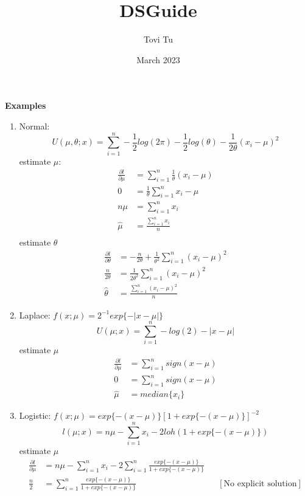 \documentclass[9pt]{article}
\title{DSGuide}
\author{Tovi Tu}
\date{March 2023}
\begin{document}
\textbf{Examples}
\begin{enumerate}
    \item Normal:
    $$
        U(\mu, \theta; x) = \sum^{n}_{i=1} -\frac{1}{2}log(2\pi) - \frac{1}{2}log(\theta) - \frac{1}{2\theta}(x_i-\mu)^2
    $$
    estimate $\mu$:
    \begin{align*}
        \frac{\partial l}{\partial \mu} &= \sum^{n}_{i=1} \frac{1}{\theta} (x_i-\mu)\\
        0 &= \frac{1}{\theta} \sum^{n}_{i=1} x_i - \mu\\
        n\mu &= \sum^{n}_{i=1} x_i\\
        \hat \mu &= \frac{\sum^{n}_{i=1} x_i}{n}\\
    \end{align*}
    estimate $\theta$ 
    \begin{align*}
        \frac{\partial l}{\partial \theta} &= -\frac{n}{2\theta} + \frac{1}{\theta^2} \sum^{n}_{i=1} (x_i-\mu)^2\\
        \frac{n}{2\theta} &= \frac{1}{2\theta^2} \sum^{n}_{i=1} (x_i-\mu)^2\\
        \hat \theta &= \frac{\sum^{n}_{i=1} (x_i-\mu)^2}{n}
    \end{align*}
    
    \item Laplace: $f(x;\mu)=2^{-1}exp\{-|x-\mu|\}$
    $$
        U(\mu;x) = \sum_{i=1}^{n} -log(2) - |x-\mu|
    $$
    estimate $\mu$
    \begin{align*}
        \frac{\partial l}{\partial \mu} &= \sum_{i=1}^{n} sign(x-\mu)\\
        0 &= \sum_{i=1}^{n} sign(x-\mu)\\
        \hat \mu &= median\{x_i\}
    \end{align*}

    \item Logistic: $f(x;\mu)=exp\{-(x-\mu)\}[1+exp\{-(x-\mu)\}]^{-2}$
    $$
        l(\mu; x) = n\mu - \sum^{n}_{i=1}x_i - 2loh(1+exp\{-(x-\mu)\})
    $$
    estimate $\mu$    
    \begin{align*}
        \frac{\partial l}{\partial \mu} &= n\mu - \sum^{n}_{i=1}x_i -2\sum^{n}_{i=1}\frac{exp\{-(x-\mu)\}}{1+exp\{-(x-\mu)\}}\\
        \frac{n}{2} &= \sum^{n}_{i=1}\frac{exp\{-(x-\mu)\}}{1+exp\{-(x-\mu)\}} && [\text{No explicit solution}]
    \end{align*}    
\end{enumerate}
\end{document}
